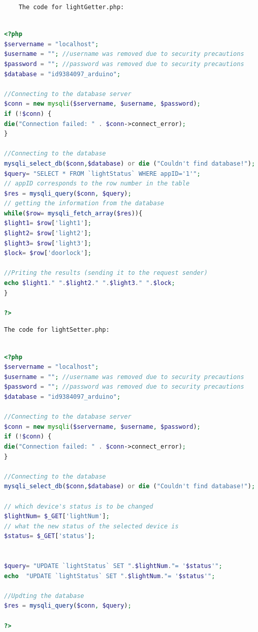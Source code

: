 \documentclass[12pt,a4paper]{report}
\begin{document}
\begin{appendices}
\begin{verbatim}
	The code for lightGetter.php:
\end{verbatim}
\vspace{-1.5cm}

\begin{lstlisting}[language={php}]

<?php
$servername = "localhost";
$username = ""; //username was removed due to security precautions
$password = ""; //password was removed due to security precautions
$database = "id9384097_arduino";

//Connecting to the database server
$conn = new mysqli($servername, $username, $password);
if (!$conn) {
die("Connection failed: " . $conn->connect_error);
}

//Connecting to the database
mysqli_select_db($conn,$database) or die ("Couldn't find database!");
$query= "SELECT * FROM `lightStatus` WHERE appID='1'";
// appID corresponds to the row number in the table
$res = mysqli_query($conn, $query);
// getting the information from the database
while($row= mysqli_fetch_array($res)){
$light1= $row['light1'];
$light2= $row['light2'];
$light3= $row['light3'];
$lock= $row['doorlock'];

//Priting the results (sending it to the request sender)
echo $light1." ".$light2." ".$light3." ".$lock;
}

?> 

\end{lstlisting}

\begin{verbatim}
The code for lightSetter.php:
\end{verbatim}
\vspace{-1cm}
\begin{lstlisting}[language={php}]

<?php
$servername = "localhost";
$username = ""; //username was removed due to security precautions
$password = ""; //password was removed due to security precautions
$database = "id9384097_arduino";

//Connecting to the database server
$conn = new mysqli($servername, $username, $password);
if (!$conn) {
die("Connection failed: " . $conn->connect_error);
}

//Connecting to the database
mysqli_select_db($conn,$database) or die ("Couldn't find database!");

// which device's status is to be changed
$lightNum= $_GET['lightNum'];
// what the new status of the selected device is
$status= $_GET['status'];


$query= "UPDATE `lightStatus` SET ".$lightNum."= '$status'";
echo  "UPDATE `lightStatus` SET ".$lightNum."= '$status'";

//Updting the database
$res = mysqli_query($conn, $query);

?> 

\end{lstlisting}

\end{appendices}
\end{document}
